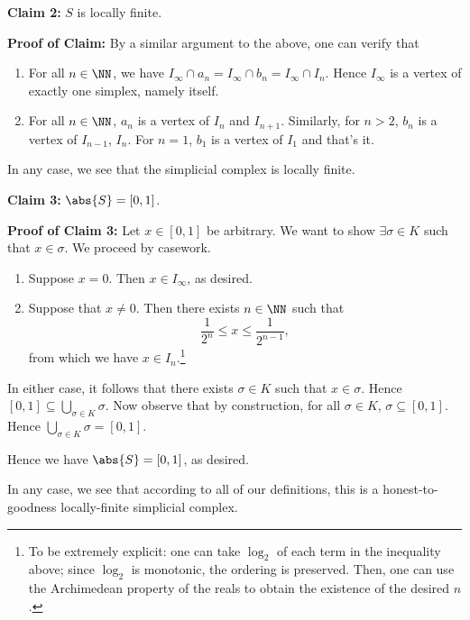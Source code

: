 \begin{sproof}[Sketch]
  \begin{leftbar}
    \textbf{Claim 2:} $S$ is locally finite.

    \noindent \textbf{Proof of Claim:} By a similar argument to the
    above, one can verify that
    \begin{enumerate}
      \item For all $n \in \NN$, we have $I_\infty \cap a_n = I_\infty
        \cap b_n = I_\infty \cap I_n$. Hence $I_\infty$ is a vertex of
        exactly one simplex, namely itself.
      \item For all $n \in \NN$, $a_n$ is a vertex of $I_n$ and
        $I_{n+1}$. Similarly, for $n > 2$, $b_n$ is a vertex of
        $I_{n-1}$, $I_n$. For $n = 1$, $b_1$ is a vertex of $I_1$ and
        that's it.
    \end{enumerate}
    In any case, we see that the simplicial complex is locally finite.
  \end{leftbar}

  \begin{leftbar}
    \textbf{Claim 3:} $\abs{S} = [0,1]$.

    \noindent \textbf{Proof of Claim 3:} Let $x \in [0,1]$ be
    arbitrary. We want to show $\exists \sigma \in K$ such that $x \in
    \sigma$. We proceed by casework.
    \begin{enumerate}
      \item Suppose $x = 0$. Then $x \in I_\infty$, as desired.
      \item Suppose that $x \neq 0$. Then there exists $n \in \NN$ such
        that
        \[
        \frac{1}{2^{n}} \leq x \leq \frac{1}{2^{n-1}},
        \]
        from which we have $x \in I_n$.\footnote{
        To be extremely explicit: one can take $\log_2$ of each term in
        the inequality above; since $\log_2$ is monotonic, the
        ordering is preserved. Then, one can use the Archimedean
        property of the reals to obtain the existence of the desired
        $n$.}
    \end{enumerate}
    In either case, it follows that there exists $\sigma \in K$ such
    that $x \in \sigma$. Hence $[0,1] \subseteq \bigcup_{\sigma \in K}
    \sigma$. Now observe that by construction, for all $\sigma \in K$,
    $\sigma \subseteq [0,1]$. Hence $\bigcup_{\sigma \in K} \sigma =
    [0,1]$.

    Hence we have $\abs{S} = [0,1]$, as desired.
  \end{leftbar}
  In any case, we see that according to all of our definitions, this
  is a honest-to-goodness locally-finite simplicial complex.
\end{sproof}
